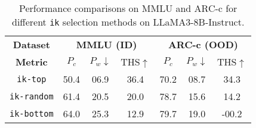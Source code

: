 \begingroup
\fontsize{6}{6}\selectfont
\setlength{\tabcolsep}{1mm}
\renewcommand{\arraystretch}{1.2} %
\label{table:Analysis}
\begin{table}[!t]
\small  %
\vspace{-0.4cm}
\caption{Performance comparisons on MMLU and ARC-c for different \texttt{ik} selection methods on LLaMA3-8B-Instruct.}
\vspace{-0.2cm}
\centering
\begin{tabular}{c|ccc|ccc}
\hline
\textbf{Dataset} & \multicolumn{3}{c|}{\textbf{MMLU (ID)}} & \multicolumn{3}{c}{\textbf{ARC-c (OOD)}} \\
\cline{1-7} 
\textbf{Metric} & $P_c$ & $P_w\downarrow$ & THS$\uparrow$ & $P_c$ & $P_w\downarrow$ & THS$\uparrow$ \\
\hline
\texttt{ik-top} & 50.4 & 06.9 & 36.4 & 70.2 & 08.7 & 34.3 \\ 
\texttt{ik-random} & 61.4 & 20.5 & 20.0 & 78.7 & 15.6 & 14.2 \\ 
\texttt{ik-bottom} & 64.0 & 25.3 & 12.9 & 79.7 & 19.0 & -00.2 \\ 
\hline
\end{tabular}
\end{table}

\endgroup
